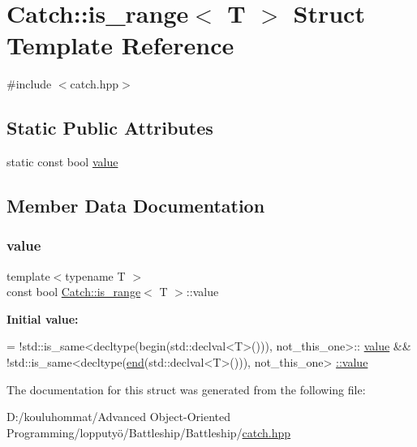 \hypertarget{struct_catch_1_1is__range}{}\section{Catch\+:\+:is\+\_\+range$<$ T $>$ Struct Template Reference}
\label{struct_catch_1_1is__range}


{\ttfamily \#include $<$catch.\+hpp$>$}

\subsection*{Static Public Attributes}
\begin{DoxyCompactItemize}
\item 
static const bool \mbox{\hyperlink{struct_catch_1_1is__range_afaec39e819c3956829cbbd00feba11be}{value}}
\end{DoxyCompactItemize}


\subsection{Member Data Documentation}
\mbox{\label{struct_catch_1_1is__range_afaec39e819c3956829cbbd00feba11be}} 
\subsubsection{\texorpdfstring{value}{value}}
{\footnotesize\ttfamily template$<$typename T $>$ \\
const bool \mbox{\hyperlink{struct_catch_1_1is__range}{Catch\+::is\+\_\+range}}$<$ T $>$\+::value\hspace{0.3cm}{\ttfamily [static]}}

{\bfseries Initial value\+:}
\begin{DoxyCode}
=
            !std::is\_same<decltype(begin(std::declval<T>())), not\_this\_one>::
      \mbox{\hyperlink{struct_catch_1_1is__range_afaec39e819c3956829cbbd00feba11be}{value}} &&
            !std::is\_same<decltype(\mbox{\hyperlink{namespace_catch_a71fef6a57614eb2d9751f8586ff6de6a}{end}}(std::declval<T>())), not\_this\_one>
      \mbox{\hyperlink{struct_catch_1_1is__range_afaec39e819c3956829cbbd00feba11be}{::value}}
\end{DoxyCode}


The documentation for this struct was generated from the following file\+:\begin{DoxyCompactItemize}
\item 
D\+:/kouluhommat/\+Advanced Object-\/\+Oriented Programming/lopputyö/\+Battleship/\+Battleship/\mbox{\hyperlink{catch_8hpp}{catch.\+hpp}}\end{DoxyCompactItemize}
